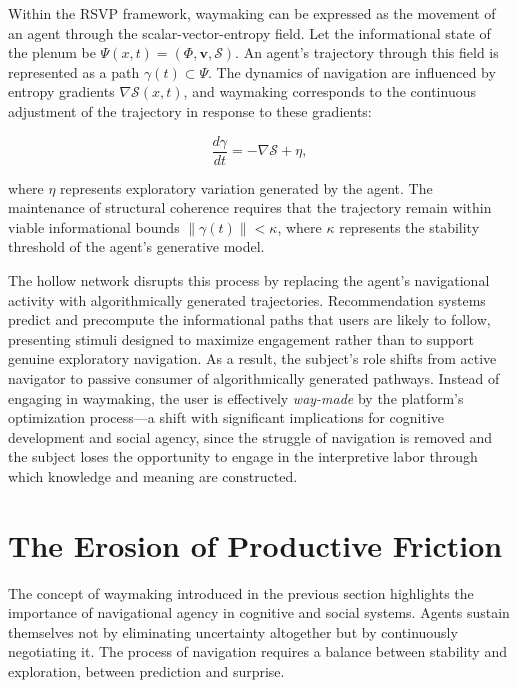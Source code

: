 \documentclass[12pt,a4paper]{article}
\begin{document}
Within the RSVP framework, waymaking can be expressed as the movement of an agent through the
scalar-vector-entropy field. Let the informational state of the plenum be
$\Psi(x,t) = (\Phi, \mathbf{v}, \mathcal{S})$. An agent's trajectory through this field is
represented as a path $\gamma(t) \subset \Psi$. The dynamics of navigation are influenced by
entropy gradients $\nabla\mathcal{S}(x,t)$, and waymaking corresponds to the continuous
adjustment of the trajectory in response to these gradients:

\[
\frac{d\gamma}{dt} = -\nabla\mathcal{S} + \eta,
\]

where $\eta$ represents exploratory variation generated by the agent. The maintenance of
structural coherence requires that the trajectory remain within viable informational bounds
$\|\gamma(t)\| < \kappa$, where $\kappa$ represents the stability threshold of the agent's
generative model.

The hollow network disrupts this process by replacing the agent's navigational activity with
algorithmically generated trajectories. Recommendation systems predict and precompute the
informational paths that users are likely to follow, presenting stimuli designed to maximize
engagement rather than to support genuine exploratory navigation. As a result, the subject's
role shifts from active navigator to passive consumer of algorithmically generated pathways.
Instead of engaging in waymaking, the user is effectively \emph{way-made} by the platform's
optimization process---a shift with significant implications for cognitive development and
social agency, since the struggle of navigation is removed and the subject loses the
opportunity to engage in the interpretive labor through which knowledge and meaning are
constructed.

\section{The Erosion of Productive Friction}

The concept of waymaking introduced in the previous section highlights the importance of
navigational agency in cognitive and social systems. Agents sustain themselves not by
eliminating uncertainty altogether but by continuously negotiating it. The process of
navigation requires a balance between stability and exploration, between prediction and
surprise.
\end{document}
